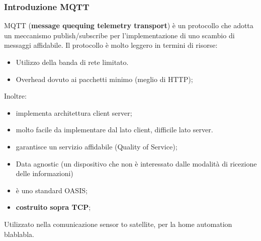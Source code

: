 \documentclass[12pt]{article}
\begin{document}
    		\subsubsection{Introduzione MQTT}
    			MQTT (\textbf{message quequing telemetry transport}) è un protocollo che adotta un meccanismo publish/subscribe per l'implementazione di uno scambio di messaggi affidabile. Il protocollo è molto leggero in termini di risorse:
    			\begin{itemize}
    				\item Utilizzo della banda di rete limitato.
    				\item Overhead dovuto ai pacchetti minimo (meglio di HTTP);
    			\end{itemize}
    			Inoltre:
    			\begin{itemize}
    				\item implementa architettura client server;
    				\item molto facile da implementare dal lato client, difficile lato server.
    				\item garantisce un servizio affidabile (Quality of Service);
    				\item Data agnostic (un dispositivo che non è interessato dalle modalità di ricezione delle informazioni)
    				\item è uno standard OASIS;
    				\item \textbf{costruito sopra TCP};
    			\end{itemize}
    			Utilizzato nella comunicazione sensor to satellite, per la home automation blablabla.
\end{document}
